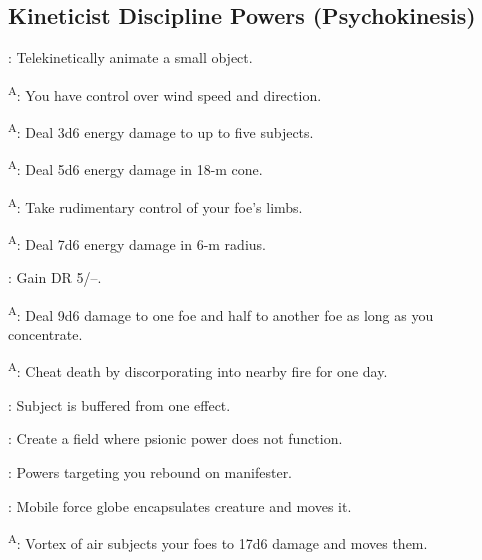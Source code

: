 \subsection{Kineticist Discipline Powers {\normalsize(Psychokinesis)}}
\begin{enumerate*}
\item {}: Telekinetically animate a small object.
\item {}\textsuperscript{A}: You have control over wind speed and direction.

\textsuperscript{A}: Deal 3d6 energy damage to up to five subjects.

\item {}\textsuperscript{A}: Deal 5d6 energy damage in 18-m cone.
\item {}\textsuperscript{A}: Take rudimentary control of your foe's limbs.

\textsuperscript{A}: Deal 7d6 energy damage in 6-m radius.

: Gain DR 5/--.

\item {}\textsuperscript{A}: Deal 9d6 damage to one foe and half to another foe as long as you concentrate.

\textsuperscript{A}: Cheat death by discorporating into nearby fire for one day.

\item {}: Subject is buffered from one  effect.

: Create a field where psionic power does not function.

\item {}: Powers targeting you rebound on manifester.
\item {}: Mobile force globe encapsulates creature and moves it.
\item {}\textsuperscript{A}: Vortex of air subjects your foes to 17d6 damage and moves them.
\end{enumerate*}



